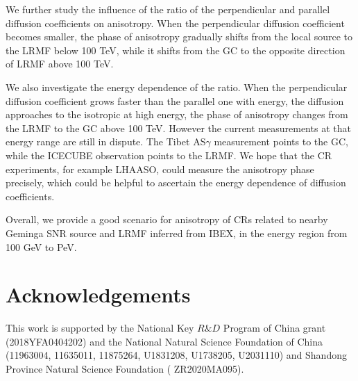 \documentclass[a4paper,11pt]{article}
\begin{document}
We further study the influence of the ratio of the perpendicular and parallel diffusion coefficients on anisotropy. When the perpendicular diffusion coefficient becomes smaller, the phase of anisotropy gradually shifts from the local source to the LRMF below 100 TeV, while it shifts from the GC to the opposite direction of LRMF above 100 TeV.

We also investigate the energy dependence of the ratio. When the perpendicular diffusion coefficient grows faster than the parallel one with energy, the diffusion approaches to the isotropic at high energy, the phase of anisotropy changes from the LRMF to the GC above 100 TeV. However the current measurements at that energy range are still in dispute. The Tibet AS$\gamma$ measurement points to the GC, while the ICECUBE observation points to the LRMF. We hope that the CR experiments, for example LHAASO, could measure the anisotropy phase precisely, which could be helpful to ascertain the energy dependence of diffusion coefficients.

Overall,  we provide a good scenario for  anisotropy of CRs related to nearby Geminga SNR source and LRMF inferred from IBEX, in the energy region from 100 GeV to PeV.




\section*{Acknowledgements}
This work is supported by the National Key $R\&D$ Program of China grant (2018YFA0404202) and  the National Natural Science Foundation of China (11963004, 11635011, 11875264, U1831208, U1738205, U2031110) and Shandong Province  Natural Science Foundation ( ZR2020MA095). 






\end{document}
